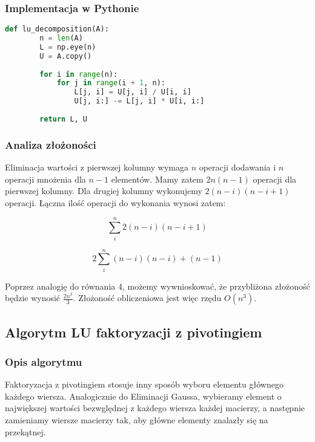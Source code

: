\documentclass[12pt,a4paper,table]{article}
\begin{document}
    \subsubsection{Implementacja w Pythonie}
    \begin{lstlisting}[language=Python]
    def lu_decomposition(A):
        n = len(A)
        L = np.eye(n)
        U = A.copy()
    
        for i in range(n):
            for j in range(i + 1, n):
                L[j, i] = U[j, i] / U[i, i]
                U[j, i:] -= L[j, i] * U[i, i:]
    
        return L, U
    \end{lstlisting}
    \subsubsection{Analiza złożoności}
    Eliminacja wartości z pierwszej kolumny wymaga $n$ operacji dodawania i $n$ operacji mnożenia dla $n-1$ elementów. Mamy zatem $2n(n-1)$ operacji dla pierwszej kolumny. Dla drugiej kolumny wykonujemy $2(n-i)(n-i+1)$ operacji. Łączna ilość operacji do wykonania wynosi zatem:

    \begin{equation}
        \sum_{i}^{n}2(n-i)(n-i+1)
    \end{equation}

    \begin{equation}
        2\sum_{i}^{n}(n-i)(n-i) + (n - 1)
    \end{equation}

    Poprzez analogię do równania 4, możemy wywnioskować, że przybliżona złożoność będzie wynosić $\frac{2n^3}{3}$. Złożoność obliczeniowa jest więc rzędu  \( O(n^3) \).

    
    \subsection{Algorytm LU faktoryzacji z pivotingiem}
    \subsubsection{Opis algorytmu}
    Faktoryzacja z pivotingiem stosuje inny sposób wyboru elementu głównego każdego wiersza. Analogicznie do Eliminacji Gaussa, wybieramy element o największej wartości bezwględnej z każdego wiersza każdej macierzy, a następnie zamieniamy wiersze macierzy tak, aby główne elementy znalazły się na przekątnej.  
\end{document}
